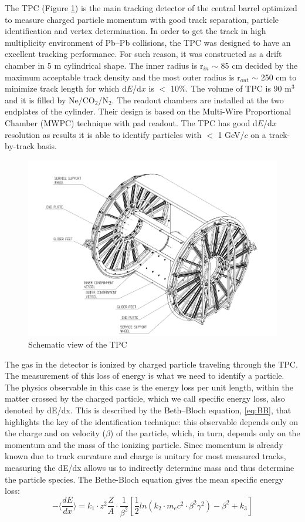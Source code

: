 The TPC \cite{cite:TPC} (Figure \ref{fig:tpc}) is the main tracking detector of the central barrel optimized to measure charged particle momentum with good track separation, particle identification and vertex determination. In order to get the track in high multiplicity environment of Pb--Pb collisions, the TPC was designed to have an excellent tracking performance. For such reason, it was constructed as a drift chamber in 5 m cylindrical shape. The inner radius is r$_{in}$ $\sim$ 85 cm decided by the maximum acceptable track density and the most outer radius is r$_{out}$ $\sim$ 250 cm to minimize track length for which d$E$/d$x$ is $<$ 10\%. The volume of TPC is 90 m$^{3}$ and it is filled by Ne/CO$_{2}$/N$_{2}$. The readout chambers are installed at the two endplates of the cylinder. Their design is based on the Multi-Wire Proportional Chamber (MWPC) technique with pad readout. The TPC has good d$E$/d$x$ resolution as results it is able to identify particles with \pt $<$ 1 GeV/$c$ on a track-by-track basis.

\begin{figure}[htbp]
\begin{center}
\includegraphics[width=10.cm]{./Version1/FigChapter4/FigureTPC}
\caption{Schematic view of the TPC}
\label{fig:tpc}
\end{center}
\end{figure}


The gas in the detector is ionized by charged particle traveling through the TPC. The measurement of this loss of energy is what we need to identify a particle. The physics observable in this case is the energy loss per unit length, within the matter crossed by the charged particle, which we call specific energy loss, also denoted by dE/dx. This is described by the Beth--Bloch equation, \ref{eq:BB}, that highlights the key of the identification technique: this observable depends only on the charge and on velocity ($\beta$) of the particle, which, in turn, depends only on the momentum and the mass of the ionizing particle. Since momentum is already known due to track curvature and charge is unitary for most measured tracks, measuring the dE/dx allows us to indirectly determine mass and thus determine the particle species.
The Bethe-Bloch equation gives the mean specific energy loss:
\begin{equation}\label{eq:BB}
- \langle\frac{dE}{dx}\rangle = k_{1} \cdot z^{2} \frac{Z}{A} \cdot \frac{1}{\beta^{2}}[\frac{1}{2}ln(k_{2}\cdot m_{e}c^{2}\cdot \beta^{2} \gamma^{2})-\beta^{2}+k_{3}]
\end{equation}

